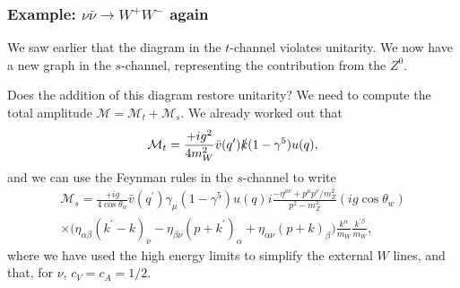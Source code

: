 \documentclass[a4paper,12pt]{article}
\begin{document}
\subsubsection{Example: $\nu \bar{\nu} \to W^+W^-$ again}
%
We saw earlier that the diagram in the $t$-channel violates unitarity. We now have a new graph in the $s$-channel, representing the contribution from the $Z^0$.
\begin{figure}[!h]
  \centering
  \hfill
\end{figure}
Does the addition of this diagram restore unitarity? We need to compute the total amplitude $\mathcal{M} = \mathcal{M}_t + \mathcal{M}_s$. We already worked out that
\begin{equation}
\mathcal{M}_t = \frac{+ig^2}{4m_W^2}\bar{v}(q^\prime)\slashed{k}(1-\gamma^5)u(q),
\end{equation}
and we can use the Feynman rules in the $s$-channel to write
\begin{equation}
\begin{split}
\mathcal{M}_s = \frac{+ig}{4\cos\theta_w}\bar{v}(q^\prime)\gamma_\mu(1-\gamma^5)u(q)i\frac{-\eta^{\mu \nu}+p^\mu p^\nu/m_Z^2}{p^2-m_Z^2}(ig\cos\theta_w) \\
\times \bigg(\eta_{\alpha \beta}(k^\prime - k)_\nu - \eta_{\beta \nu} (p + k^\prime)_\alpha + \eta_{\alpha \nu}(p+k)_\beta \bigg)\frac{k^\alpha}{m_W}\frac{k^{\prime \beta}}{m_W},
\end{split}
\end{equation}
where we have used the high energy limits to simplify the external $W$ lines, and that, for $\nu$, $c_V = c_A = 1/2$.
\end{document}

